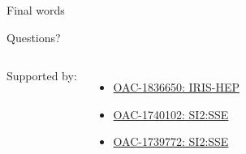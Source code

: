 \begin{frame}{Final words}

\vspace{1cm}
\begin{center}
    \textcolor{lhcbBlue}{ \huge Questions?}
\end{center}

\vspace{1.5cm}
\begin{columns}
	Supported by:
	\begin{itemize}
		\item \href{https://www.nsf.gov/awardsearch/showAward?AWD_ID=1836650}{OAC-1836650: IRIS-HEP}
		\item \href{https://www.nsf.gov/awardsearch/showAward?AWD_ID=1740102}{OAC-1740102: SI2:SSE}
		\item \href{https://www.nsf.gov/awardsearch/showAward?AWD_ID=1739772}{OAC-1739772: SI2:SSE}
	\end{itemize}
\end{columns}


\end{frame}
